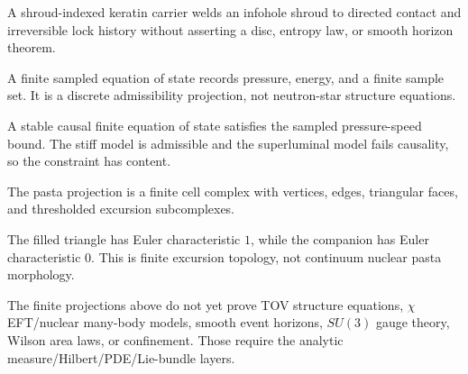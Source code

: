 \begin{proposition}\label{thm:shroud-indexed-keratin}\leanok{}
A shroud-indexed keratin carrier welds an infohole shroud to directed contact
and irreversible lock history without asserting a disc, entropy law, or smooth
horizon theorem.
\end{proposition}

\begin{proposition}\label{thm:finite-eos}\leanok{}
A finite sampled equation of state records pressure, energy, and a finite sample
set.  It is a discrete admissibility projection, not neutron-star structure
equations.
\end{proposition}

\begin{theorem}\label{thm:eos-speed-bound}\leanok{}
A stable causal finite equation of state satisfies the sampled pressure-speed
bound.  The stiff model is admissible and the superluminal model fails
causality, so the constraint has content.
\end{theorem}

\begin{proposition}\label{thm:pasta-cell-complex}\leanok{}
The pasta projection is a finite cell complex with vertices, edges, triangular
faces, and thresholded excursion subcomplexes.
\end{proposition}

\begin{theorem}\label{thm:pasta-euler-witnesses}\leanok{}
The filled triangle has Euler characteristic \(1\), while the companion
 has Euler
characteristic \(0\).  This is finite excursion topology, not continuum nuclear
pasta morphology.
\end{theorem}

\begin{theorem}\label{thm:continuum-dense-matter-frontier}\notready{}
The finite projections above do not yet prove TOV structure equations,
\(\chi\)EFT/nuclear many-body models, smooth event horizons, \(SU(3)\) gauge
theory, Wilson area laws, or confinement.  Those require the analytic
measure/Hilbert/PDE/Lie-bundle layers.
\end{theorem}
